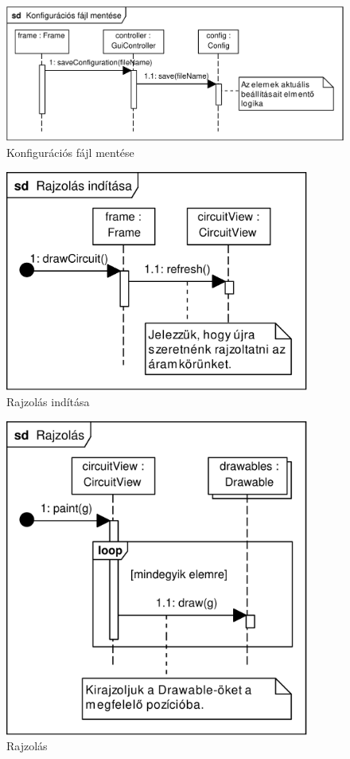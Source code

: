 \begin{figure}[H]
\begin{center}
\includegraphics[width=17cm]{chapters/chapter11/pdfs/4_saveconfig.pdf}
\caption{Konfigurációs fájl mentése}
\label{fig:saveconfig}
\end{center}
\end{figure}

\begin{figure}[H]
\begin{center}
\includegraphics[width=10cm]{chapters/chapter11/pdfs/5_paint1.pdf}
\caption{Rajzolás indítása}
\label{fig:paint1}
\end{center}
\end{figure}

\begin{figure}[H]
\begin{center}
\includegraphics[width=10cm]{chapters/chapter11/pdfs/6_paint2.pdf}
\caption{Rajzolás}
\label{fig:paint2}
\end{center}
\end{figure}

